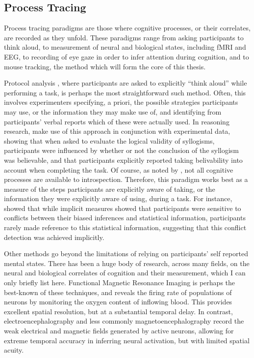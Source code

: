 \subsection{Process Tracing}
\label{subsec:chapter1-measurement-process-tracing}

Process tracing paradigms are those where
cognitive processes, or their correlates, are recorded as they unfold.
These paradigms range from asking participants to think aloud,
to measurement of neural and biological states, including fMRI and EEG,
to recording of eye gaze in order to infer attention during cognition,
and to mouse tracking, the method which will form the core of this thesis.

Protocol analysis \citep{Ranyard2010,Ericsson1980},
where participants are asked to explicitly ``think aloud'' while performing a task,
is perhaps the most straightforward such method.
Often, this involves experimenters specifying, a priori,
the possible strategies participants may use,
or the information they may make use of,
and identifying from participants' verbal reports
which of these were actually used.
In reasoning research,
\citet{Evans1983} make use of this approach
in conjunction with experimental data,
showing that when asked to evaluate the logical validity of syllogisms,
participants were influenced by whether or not
the conclusion of the syllogism was believable,
and that participants explicitly reported taking belivability into account
when completing the task.
Of course, as noted by \citet{Nisbett1977},
not all cognitive processes are available to introspection.
Therefore, this paradigm works best as a measure of 
the steps participants are explicitly aware of taking,
or the information they were explicitly aware of using, during a task.
For instance, \citet{DeNeys2008} showed that while
implicit measures showed that participants were sensitive to
conflicts between their biased inferences and statistical information,
participants rarely made reference to this statistical information,
suggesting that this conflict detection was achieved implicitly.

Other methods go beyond the limitations
of relying on participants' self reported mental states.
There has been a huge body of research, across many fields,
on the neural and biological correlates of cognition and their measurement,
which I can only briefly list here.
Functional Magnetic Resonance Imaging \citep[fMRI;][]{Huettel2004}
is perhaps the best-known of these techniques,
and reveals the firing rate of populations of neurons
by monitoring the oxygen content of inflowing blood.
This provides excellent spatial resolution,
but at a substantial temporal delay.
In contrast, electroencephalography \citep[EEG;][]{Niedermeyer2005}
and less commonly magnetoencephalography \citep[MEG;][]{Hamalainen1993}
record the weak electrical and magnetic fields generated by active neurons,
allowing for extreme temporal accuracy in inferring neural activation,
but with limited spatial acuity.

